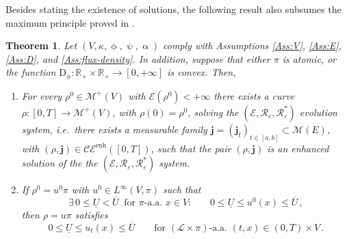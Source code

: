 \documentclass[11pt,reqno]{amsart}
\numberwithin{equation}{section}
\newcommand{\ENHCE}[2]{\calC \calE^{\mathrm{enh}}([#1,#2])}
\newcommand{\R}{\mathbb{R}}
\newcommand{\calC}{\mathcal{C}}
\newcommand{\calE}{\mathcal{E}}
\newcommand{\calM}{\mathcal{M}}
\newcommand{\scrL}{\mathscr{L}}
\newcommand{\eps}{\varepsilon}
\newtheorem{theorem}{Theorem}[section]
\theoremstyle{definition}
\newcommand{\ep}{\varepsilon}
\let\eps\ep
\newcommand{\scrR}{\mathscr{R}}
\newcommand{\scrE}{\mathscr{E}}
\newcommand{\jj}{{\boldsymbol{j}}}
\newcommand{\RBS}{\color{black}} %
\newcommand{\RNEW}{\color{black}} %
\newcommand{\EEE}{\color{black}}
\numberwithin{equation}{section}
\begin{document}
\RNEW
Besides stating the existence of solutions, the following result also subsumes the maximum principle proved in \cite[Thm.\ 6.5]{PRST22}. 
   \EEE
\begin{theorem}{\cite[Thm.\ 5.10, Thm.\ 6.5]{PRST22}}
\RNEW Let  $(V,\kappa,\upphi,\uppsi,\upalpha)$ comply with
 Assumptions \ref{Ass:V},  \ref{Ass:E},   \ref{Ass:D}, and \ref{Ass:flux-density}.
In addition, suppose that 
either $\pi$ is atomic, or the function 
$\mathrm{D}_\upphi: \R_+\times \R_+ \to [0,+\infty]  $
 is convex. \EEE
 Then,
 \begin{enumerate}
 \item For every $\rho^0\in \calM^+(V)$ with \RNEW  $\scrE(\rho^0)<+\infty$ \EEE there exists a curve $\rho: [0,T]\to \calM^+(V)$, with $\rho(0)=\rho^0$, solving the  $(\scrE,\scrR_\eps,\scrR_\eps^*)$ evolution system, i.e.\ there exists a measurable family $\jj = (\jj_t)_{t\in [a,b]} \subset \calM(E)$, with 
 $ (\rho,\jj) \in  \ENHCE 0T$, such that the pair  $ (\rho,\jj) $
 \RBS is an \emph{enhanced} solution of the 
  the $(\scrE,\scrR_\eps,\scrR_\eps^*)$ system. \EEE
 \item If  $\rho^0 = u^0 \pi$ with $u^0 \in L^\infty(V,\pi)$ such that
 \begin{equation}
 \exists\, 0 \leq  \underline{U} < \overline{U} \ \text{ for $\pi$-a.a.\ $x\in V$:} \qquad 
  0 \leq \underline{U} \leq u^0(x) \leq \overline{U}\,,
  \end{equation}
  then 
  $\rho = u \pi$ satisfies
  \begin{equation}
  \label{boundedness}
   0 \leq \underline{U} \leq u_t(x) \leq \overline{U} \qquad \text{for } (\scrL{\times}\pi)\text{-a.a. } (t,x) \in (0,T){\times}V\,.
  \end{equation}
 \end{enumerate}
\end{theorem}
\par
\end{document}
